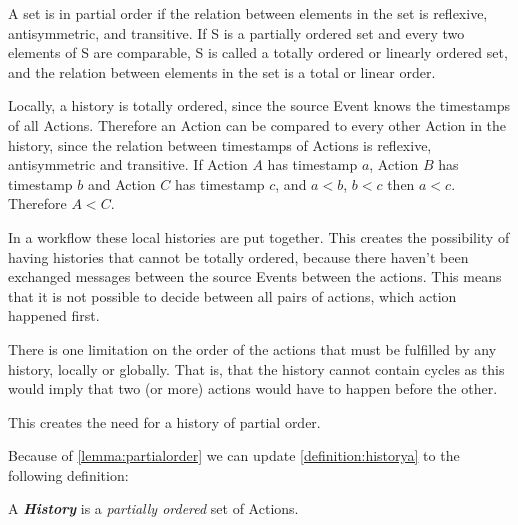 \begin{lemma}\label{lemma:partialorder}
	A set is in partial order if the relation between elements in the set is reflexive, antisymmetric, and transitive.
	If S is a partially ordered set and every two elements of S are comparable, S is called a totally ordered or linearly ordered set, and the relation between elements in the set is a total or linear order.
	
	Locally, a history is totally ordered, since the source Event knows the timestamps of all Actions. Therefore an Action can be compared to every other Action in the history, since the relation between timestamps of Actions is reflexive, antisymmetric and transitive. 
	If Action $A$ has timestamp $a$, Action $B$ has timestamp $b$ and Action $C$ has timestamp $c$, and $a < b$, $b < c$ then $a < c$. Therefore $A < C$.
	
	In a workflow these local histories are put together. This creates the possibility of having histories that cannot be totally ordered, because there haven't been exchanged messages between the source Events between the actions. This means that it is not possible to decide between all pairs of actions, which action happened first.
	
	There is one limitation on the order of the actions that must be fulfilled by any history, locally or globally. That is, that the history cannot contain cycles as this would imply that two (or more) actions would have to happen before the other.
	
	
	This creates the need for a history of partial order.
\end{lemma}

\newpar Because of \autoref{lemma:partialorder} we can update \autoref{definition:historya} to the following definition:

\begin{definition}
	A \textit{\textbf{History}} is a \textit{partially ordered} set of Actions.
	\label{definition:historyb}
\end{definition}

